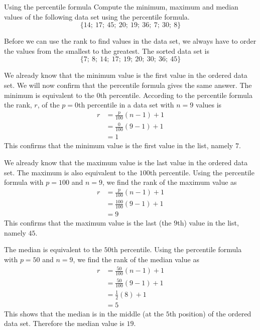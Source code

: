 \begin{wex}{Using the percentile formula}{
    Compute the minimum, maximum and median values of the following
    data set using the percentile formula.
    \begin{equation}
      \{14;\ 17;\ 45;\ 20;\ 19;\ 36;\ 7;\ 30;\ 8\}
    \end{equation}
}{

    Before we can use the rank to find values in the data set, we
    always have to order the values from the smallest to the
    greatest. The sorted data set is
    \begin{equation}
      \{7;\ 8;\ 14;\ 17;\ 19;\ 20;\ 30;\ 36;\ 45\}
    \end{equation}


    We already know that the minimum value is the first value in the
    ordered data set. We will now confirm that the percentile formula
    gives the same answer. The minimum is equivalent to the $0$th
    percentile. According to the percentile formula the rank, $r$, of the
    $p = 0$th percentile in a data set with $n=9$ values is
    \begin{align}
      r &= \frac{p}{100}\left(n-1\right)+1 \\
        &= \frac{0}{100}\left(9-1\right)+1 \\
        &= 1
    \end{align}
    This confirms that the minimum value is the first value in the
    list, namely $7$.


    We already know that the maximum value is the last value in the
    ordered data set. The maximum is also equivalent to the $100$th
    percentile. Using the percentile formula with $p=100$ and $n=9$,
    we find the rank of the maximum value as
    \begin{align}
      r &= \frac{p}{100}\left(n-1\right)+1 \\
        &= \frac{100}{100}\left(9-1\right)+1 \\
        &= 9
    \end{align}
    This confirms that the maximum value is the last (the $9$th) value
    in the list, namely $45$.


    The median is equivalent to the $50$th percentile. Using the
    percentile formula with $p=50$ and $n=9$, we find the rank of the
    median value as
    \begin{align}
      r &= \frac{50}{100}\left(n-1\right)+1 \\
        &= \frac{50}{100}\left(9-1\right)+1 \\
        &= \frac{1}{2}(8)+1 \\
        &= 5
    \end{align}
    This shows that the median is in the middle (at the $5$th position)
    of the ordered data set. Therefore the median value is $19$. 

}
\end{wex}

